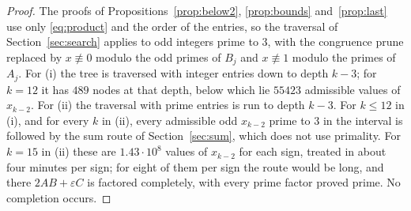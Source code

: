 \documentclass[11pt,reqno]{amsart}
\numberwithin{equation}{section}
\theoremstyle{plain}
\theoremstyle{definition}
\theoremstyle{remark}
\begin{document}
\begin{proof}
The proofs of Propositions~\ref{prop:below2}, \ref{prop:bounds}
and~\ref{prop:last} use only \eqref{eq:product} and the order of the
entries, so the traversal of Section~\ref{sec:search} applies to odd
integers prime to $3$, with the congruence prune replaced by
$x\not\equiv0$ modulo the odd primes of $B_j$ and $x\not\equiv1$ modulo
the primes of $A_j$. For (i) the tree is traversed with integer entries
down to depth $k-3$; for $k=12$ it has $489$ nodes at that depth, below
which lie $55423$ admissible values of $x_{k-2}$. For (ii) the
traversal with prime entries is run to depth $k-3$. For $k\le12$ in
(i), and for every $k$ in (ii), every admissible odd $x_{k-2}$ prime to
$3$ in the interval is followed by the sum route of
Section~\ref{sec:sum}, which does not use primality. For $k=15$ in
(ii) these are $1.43\cdot10^8$ values of $x_{k-2}$ for each sign,
treated in about four minutes per sign; for eight of them per sign the
route would be long, and there $2AB+\varepsilon C$ is factored
completely, with every prime factor proved prime. No completion occurs.


\end{proof}
\end{document}
